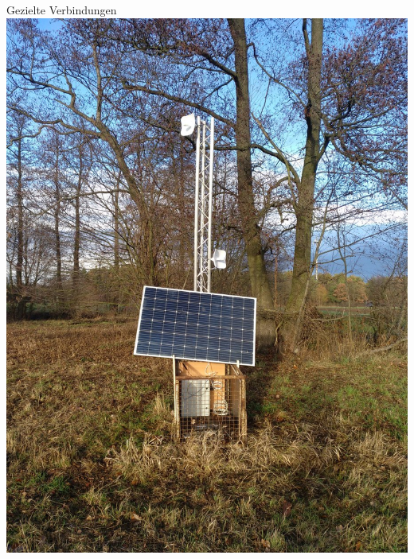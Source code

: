 \documentclass{beamer}
\begin{document}
	\begin{frame}[standout]{Gezielte Verbindungen}
		\includegraphics[height=0.75\framewidth]{media/p2p-solar.jpg}
	\end{frame}
\end{document}
